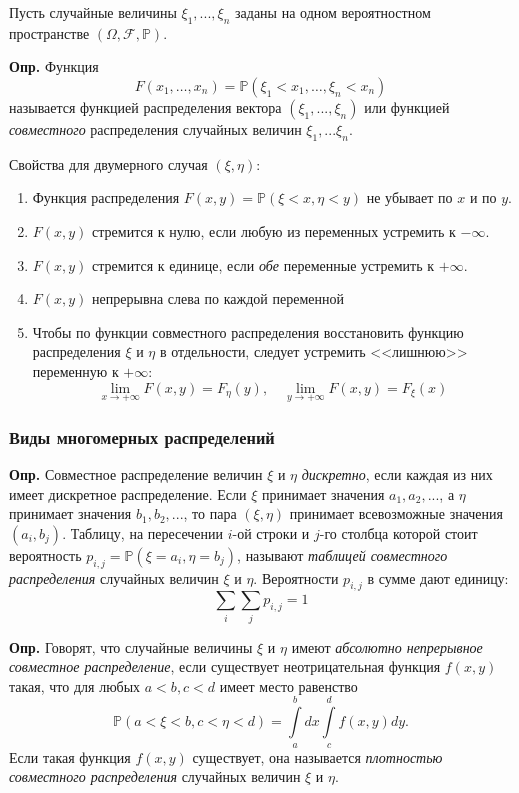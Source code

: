 \documentclass[oneside,final,14pt]{extreport}
\newcommand\mydef{{\bf Опр.}}
\newcommand\myprob[1]{{\mathbb{P}(#1)}}
\theoremstyle{definition}
\begin{document}
Пусть случайные величины $\xi_1, ..., \xi_n$ заданы на одном вероятностном пространстве $(\Omega, \mathcal{F}, \mathbb{P})$.

\mydef{} Функция $$F\left(x_{1}, \ldots, x_{n}\right)=\mathbb{P}\left(\xi_{1}<x_{1}, \ldots, \xi_{n}<x_{n}\right)$$
называется функцией распределения вектора $(\xi_1, ..., \xi_n)$ или функцией {\it совместного} распределения случайных величин $\xi_1, ... \xi_n$.

Свойства для двумерного случая $(\xi, \eta)$:

\begin{enumerate}
    \item Функция распределения $F(x,y) = \myprob{\xi < x, \eta < y}$ не убывает по $x$ и по $y$.
    \item $F(x,y)$ стремится к нулю, если любую из переменных устремить к $-\infty$.
    \item $F(x,y)$ стремится к единице, если {\it обе} переменные устремить к $+\infty$.
    \item $F(x,y)$ непрерывна слева по каждой переменной
    \item Чтобы по функции совместного распределения восстановить функцию распределения $\xi$ и $\eta$ в отдельности, следует устремить <<лишнюю>> переменную к $+\infty$:
    $$\lim _{x \rightarrow+\infty} F(x, y)=F_{\eta}(y), \quad \lim _{y \rightarrow+\infty} F(x, y)=F_{\xi}(x)$$
\end{enumerate}

\subsubsection{Виды многомерных распределений}

\mydef{} Совместное распределение величин $\xi$ и $\eta$ {\it дискретно}, если каждая из них имеет дискретное распределение. Если $\xi$ принимает значения $a_1, a_2, ...$, а $\eta$ принимает значения $b_1, b_2, ...$, то пара $(\xi, \eta)$ принимает всевозможные значения $(a_i, b_j)$. Таблицу, на пересечении $i$-ой строки и $j$-го столбца которой стоит вероятность $p_{i,j} = \myprob{\xi = a_i, \eta = b_j}$, называют {\it таблицей совместного распределения} случайных величин $\xi$ и $\eta$. Вероятности $p_{i,j}$ в сумме дают единицу:
$$\sum_{i} \sum_{j} p_{i, j}=1$$

\mydef{} Говорят, что случайные величины $\xi$ и $\eta$ имеют {\it абсолютно непрерывное совместное распределение}, если существует неотрицательная функция $f(x,y)$ такая, что для любых $a < b, c < d$ имеет место равенство
$$\mathbb{P}(a<\xi<b, c<\eta<d)=\int\limits_{a}^{b} d x \int\limits_{c}^{d} f(x, y) d y.$$
Если такая функция $f(x,y)$ существует, она называется {\it плотностью совместного распределения} случайных величин $\xi$ и $\eta$.
\end{document}
